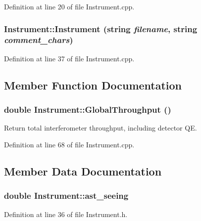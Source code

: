 Definition at line 20 of file Instrument.cpp.

\hypertarget{classInstrument_a44911c880ba30eaf211f3905fc7ae7b5}{
\subsubsection[{Instrument}]{\setlength{\rightskip}{0pt plus 5cm}Instrument::Instrument (string {\em filename}, \/  string {\em comment\_\-chars})}}
\label{classInstrument_a44911c880ba30eaf211f3905fc7ae7b5}


Definition at line 37 of file Instrument.cpp.



\subsection{Member Function Documentation}
\hypertarget{classInstrument_aa43fea34962ffe530cc5cfb0dbaa67c2}{
\subsubsection[{GlobalThroughput}]{\setlength{\rightskip}{0pt plus 5cm}double Instrument::GlobalThroughput ()}}
\label{classInstrument_aa43fea34962ffe530cc5cfb0dbaa67c2}
Return total interferometer throughput, including detector QE. 

Definition at line 68 of file Instrument.cpp.



\subsection{Member Data Documentation}
\hypertarget{classInstrument_a508dcac890549428696372a66ed5d3bc}{
\subsubsection[{ast\_\-seeing}]{\setlength{\rightskip}{0pt plus 5cm}double {\bf Instrument::ast\_\-seeing}}}
\label{classInstrument_a508dcac890549428696372a66ed5d3bc}


Definition at line 36 of file Instrument.h.

